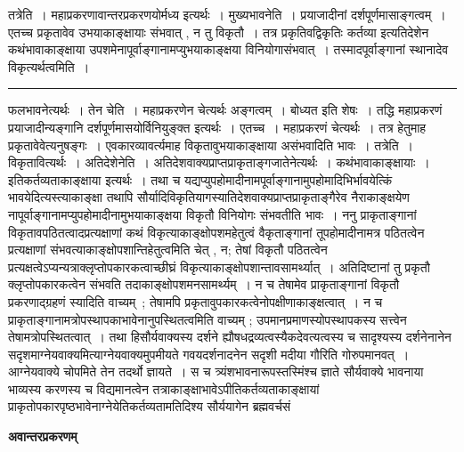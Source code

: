 \documentclass[11pt, openany]{book}
\begin{document}
 {\br तत्रेति~।} महाप्रकरणावान्तरप्रकरणयोर्मध्य इत्यर्थः~। {\br मुख्यभावनेति~।}
\newpage
\fancyhead[RE]{[ महाप्रकरणम् ]}
{\bl\noindent प्रयाजादीनां दर्शपूर्णमासाङ्गत्वम्~। एतच्च प्रकृतावेव उभयाकाङ्क्षायाः संभवात् , न तु विकृतौ~। तत्र {\qtl प्रकृतिवद्विकृतिः कर्तव्या} इत्यतिदेशेन कथंभावाकाङ्क्षाया उपशमेनापूर्वाङ्गानामप्युभयाकाङ्क्षया विनियोगासंभवात्~। तस्मादपूर्वाङ्गानां स्थानादेव विकृत्यर्थत्वमिति~।}\\
\hrule
\vspace{3mm}
\noindent
फलभावनेत्यर्थः~। {\br तेन चेति~।} महाप्रकरणेन चेत्यर्थः अङ्गत्वम्~। बोध्यत इति शेषः~। तद्धि महाप्रकरणं प्रयाजादीन्यङ्गानि दर्शपूर्णमासयोर्विनियुङ्क्त इत्यर्थः~। {\br एतच्च}~। महाप्रकरणं चेत्यर्थः~। तत्र हेतुमाह प्रकृतावेवेत्यनुषङ्गः~। एवकारव्यावर्त्यमाह विकृतावुभयाकाङ्क्षाया असंभवादिति भावः~। {\br तत्रेति~।} विकृतावित्यर्थः~। {\br अतिदेशेनेति}~। अतिदेशवाक्यप्राप्तप्राकृताङ्गजातेनेत्यर्थः~। {\bl कथंभावाकाङ्क्षायाः~।} इतिकर्तव्यताकाङ्क्षाया इत्यर्थः~। तथा च यद्यप्युपहोमादीनामपूर्वाङ्गानामुपहोमादिभिर्भावयेत्किं भावयेदित्यस्त्याकाङ्क्षा तथापि सौर्यादिविकृतियागस्यातिदेशवाक्यप्राप्तप्राकृताङ्गैरेव नैराकाङ्क्षयेण नापूर्वाङ्गानामप्युपहोमादीनामुभयाकाङ्क्षया विकृतौ विनियोगः संभवतीति भावः~। {\br ननु} प्राकृताङ्गानां विकृतावपठितत्वादप्रत्यक्षाणां कथं विकृत्याकाङ्क्षोपशमहेतुत्वं वैकृताङ्गानां तूपहोमादीनामत्र पठितत्वेन प्रत्यक्षाणां संभवत्याकाङ्क्षोपशान्तिहेतुत्वमिति चेत् , न; तेषां विकृतौ
पठितत्वेन प्रत्यक्षत्वेऽप्यन्यत्राक्लृप्तोपकारकत्वाच्छीघ्रं विकृत्याकाङ्क्षोपशान्तावसामर्थ्यात्~। अतिदिष्टानां तु प्रकृतौ क्लृप्तोपकारकत्वेन संभवति तदाकाङ्क्षोपशमनसामर्थ्यम्~। न च तेषामेव प्राकृताङ्गानां विकृतौ प्रकरणाद्ग्रहणं स्यादिति वाच्यम्~; तेषामपि प्रकृतावुपकारकत्वेनोपक्षीणाकाङ्क्षत्वात्~। न च प्राकृताङ्गानामत्रोपस्थापकाभावेनानुपस्थितत्वमिति वाच्यम् ; उपमानप्रमाणस्योपस्थापकस्य सत्त्वेन तेषामत्रोपस्थितत्वात्~। तथा हि\textendash सौर्यवाक्यस्य दर्शने ह्यौषधद्रव्यत्वस्यैकदेवत्यत्वस्य च सादृश्यस्य दर्शनेनानेन सदृशमाग्नेयवाक्यमित्याग्नेयवाक्यमुपमीयते गवयदर्शनादनेन सदृशी मदीया गौरिति गोरुपमानवत्~। आग्नेयवाक्ये चोपमिते तेन तदर्थो ज्ञायते~। स च त्र्यंशभावनारूपस्तस्मिंश्च ज्ञाते सौर्यवाक्ये भावनाया भाव्यस्य करणस्य च विद्यमानत्वेन तत्राकाङ्क्षाभावेऽपीतिकर्तव्यताकाङ्क्षायां प्राकृतोपकारपृष्ठभावेनाग्नेयेतिकर्तव्यतामतिदिश्य सौर्ययागेन ब्रह्मवर्चसं
\newpage
\begin{center}
 \textbf{अवान्तरप्रकरणम्}
\end{center}
 
\end{document}
